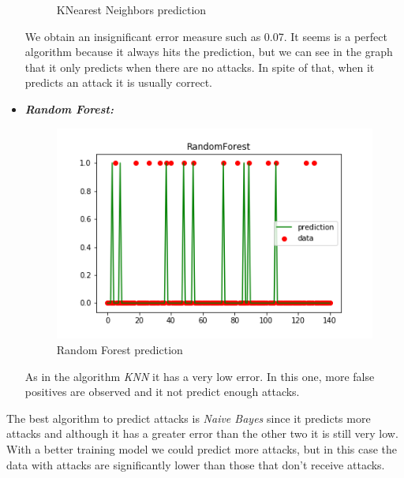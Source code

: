 \begin{itemize}
\begin{figure}[H]
		\caption{KNearest Neighbors prediction}
	\end{figure}
	We obtain an insignificant error measure such as 0.07. It seems is a perfect algorithm because it always hits the prediction, but we can see in the graph that it only predicts when there are no attacks. In spite of that, when it predicts an attack it is usually correct.
	\item \textbf{\textit{Random Forest:}}
	\begin{figure}[H]
		\centering
		\includegraphics{../../reports/figures/RandomForestPrediction}
		\caption{Random Forest prediction}
	\end{figure}
	As in the algorithm \textit{KNN} it has a very low error. In this one, more false positives are observed and it not predict enough attacks.
\end{itemize}
The best algorithm to predict attacks is \textit{Naive Bayes} since it predicts more attacks and although it has a greater error than the other two it is still very low. With a better training model we could predict more attacks, but in this case the data with attacks are significantly lower than those that don't receive attacks.